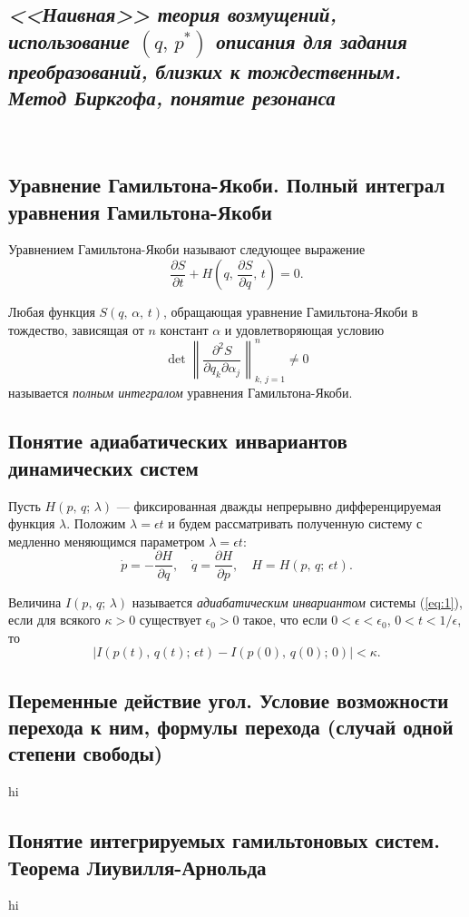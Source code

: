 \documentclass[a4paper,12pt]{article}
\begin{document}
\subsection{\emph{<<Наивная>> теория возмущений, использование $(q,\,p^*)$ описания
для задания преобразований, близких к тождественным. Метод Биркгофа, понятие
резонанса}}
🤔🤔🤔
\subsection{Уравнение Гамильтона-Якоби. Полный интеграл уравнения
Гамильтона-Якоби}
\begin{dfn}
	Уравнением Гамильтона-Якоби называют следующее выражение
\[
	\frac{\partial S}{\partial t} +H\left(q,\,\frac{\partial S}{\partial q} ,\,t\right)=0
.\]
\end{dfn}
\begin{dfn}
Любая функция $S(q,\,\alpha,\,t)$, обращающая уравнение Гамильтона-Якоби в
тождество, зависящая от $n$ констант $\alpha$ и удовлетворяющая условию
\[
\det \left\| \frac{\partial^2 S}{\partial q_k \partial \alpha_j} \right\|^n_{k,\,j=1}\neq 0
\]
называется \emph{полным интегралом} уравнения Гамильтона-Якоби.
\end{dfn}
\subsection{Понятие адиабатических инвариантов динамических систем}
Пусть $H(p,\,q;\,\lambda)$ --- фиксированная дважды непрерывно дифференцируемая
функция $\lambda$. Положим $\lambda=\epsilon t$ и будем рассматривать
полученную систему с медленно меняющимся параметром $\lambda=\epsilon t$:
\[
	\dot{p}=-\frac{\partial H}{\partial q} , \quad
	\dot{q}=\frac{\partial H}{\partial p} ,\quad H=H(p,\,q;\,\epsilon t)
	\tag{*}
	\label{eq:1}
.\] 
\begin{dfn}
	Величина $I(p,\,q;\,\lambda)$ называется \emph{адиабатическим 
	инвариантом} системы (\ref{eq:1}), если для всякого $\kappa>0$
	существует   $\epsilon_0>0$ такое, что если  $0<\epsilon<\epsilon_0$,
	$0<t<1 /\epsilon$, то
	 \[
		 |I(p(t),\,q(t);\,\epsilon t)-I(p(0),\,q(0);\,0)|<\kappa
	.\] 
\end{dfn}
\subsection{Переменные действие угол. Условие возможности перехода к ним,
формулы
перехода (случай одной степени свободы)}
hi
\subsection{Понятие интегрируемых гамильтоновых систем. Теорема
Лиувилля-Арнольда}
hi
\end{document}
